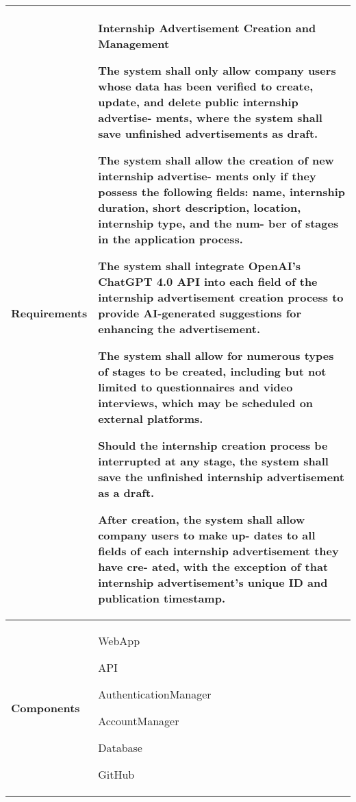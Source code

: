 \begin{table}[h]
    \centering
    \renewcommand{\arraystretch}{1.5} %
    \begin{tabular}{|C{0.3\textwidth}|L{0.65\textwidth}|} %
        \hline
        \textbf{Requirements} & 
        \textbf{Internship Advertisement Creation and Management} \par
        [FR20] The system shall only allow company users whose data has been
        verified to create, update, and delete public internship advertise-
        ments, where the system shall save unfinished advertisements as
        draft. \par
        [FR21] The system shall allow the creation of new internship advertise-
        ments only if they possess the following fields: name, internship
        duration, short description, location, internship type, and the num-
        ber of stages in the application process. \par
        [FR22] The system shall integrate OpenAI’s ChatGPT 4.0 API into each
        field of the internship advertisement creation process to provide
        AI-generated suggestions for enhancing the advertisement. \par
        [FR23] The system shall allow for numerous types of stages to be created,
        including but not limited to questionnaires and video interviews,
        which may be scheduled on external platforms. \par
        [FR24] Should the internship creation process be interrupted at any stage,
        the system shall save the unfinished internship advertisement as a
        draft. \par
        [FR25] After creation, the system shall allow company users to make up-
        dates to all fields of each internship advertisement they have cre-
        ated, with the exception of that internship advertisement’s unique
        ID and publication timestamp. \\
        \hline
        \textbf{Components} & 
        WebApp \par
        API \par
        AuthenticationManager \par
        AccountManager \par
        Database \par
        GitHub \\
        \hline
    \end{tabular}
\end{table}


